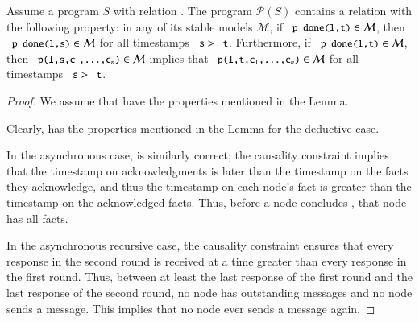 
\begin{lemma}[Sealing]
\label{lem:plang-done-right}
Assume a \plang program $S$ with relation .  The \lang program $\mathcal{P}(S)$ contains a relation  with the following property: in any of its stable models $\mathcal{M}$, if $\dedalus{p_done(l,t)} \in \mathcal{M}$,  then $\dedalus{p_done(l,s)} \in \mathcal{M}$ for all timestamps $\dedalus{s} > \dedalus{t}$.  Furthermore, if $\dedalus{p_done(l,t)} \in \mathcal{M}$, then $\dedalus{p(l,s,c\sub{1},\ldots,c\sub{n})} \in \mathcal{M}$ implies that $\dedalus{p(l,t,c\sub{1},\ldots,c\sub{n})} \in \mathcal{M}$ for all timestamps $\dedalus{s} > \dedalus{t}$.
\end{lemma}
\begin{proof}
We assume that  have the properties mentioned in the Lemma.

Clearly,  has the properties mentioned in the Lemma for the deductive case.

In the asynchronous case,  is similarly correct; the causality constraint implies that the timestamp on acknowledgments is later than the timestamp on the facts they acknowledge, and thus the timestamp on each node's  fact is greater than the timestamp on the acknowledged facts.  Thus, before a node concludes , that node has all  facts.

In the asynchronous recursive case, the causality constraint ensures that every response in the second round is received at a time greater than every response in the first round.  Thus, between at least the last response of the first round and the last response of the second round, no node has outstanding messages and no node sends a message.  This implies that no node ever sends a message again.
\end{proof}


